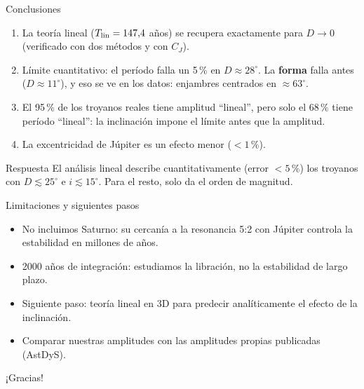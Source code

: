 \documentclass[aspectratio=169, 11pt]{beamer}
\begin{document}
\begin{frame}{Conclusiones}
\begin{enumerate}
\item La teoría lineal ($T_{\rm lin}=147{,}4$ años) se recupera exactamente para $D\to0$ (verificado con dos métodos y con $C_J$).
\item Límite cuantitativo: el período falla un 5\,\% en $D\approx28^\circ$. La \textbf{forma} falla antes ($D\approx11^\circ$), y eso se ve en los datos: enjambres centrados en $\approx63^\circ$.
\item El 95\,\% de los troyanos reales tiene amplitud ``lineal'', pero solo el 68\,\% tiene período ``lineal'': \alert{la inclinación impone el límite antes que la amplitud.}
\item La excentricidad de Júpiter es un efecto menor ($<1\,\%$).
\end{enumerate}
\begin{block}{Respuesta}
El análisis lineal describe cuantitativamente (error $<5\,\%$) los troyanos con $D\lesssim25^\circ$ e $i\lesssim15^\circ$. Para el resto, solo da el orden de magnitud.
\end{block}
\end{frame}

\begin{frame}{Limitaciones y siguientes pasos}
\begin{itemize}
\item No incluimos Saturno: su cercanía a la resonancia 5:2 con Júpiter controla la estabilidad en millones de años.
\item 2000 años de integración: estudiamos la libración, no la estabilidad de largo plazo.
\item Siguiente paso: teoría lineal en 3D para predecir analíticamente el efecto de la inclinación.
\item Comparar nuestras amplitudes con las amplitudes propias publicadas (AstDyS).
\end{itemize}
\vspace{0.6cm}
\centering\Large ¡Gracias!
\end{frame}
\end{document}
